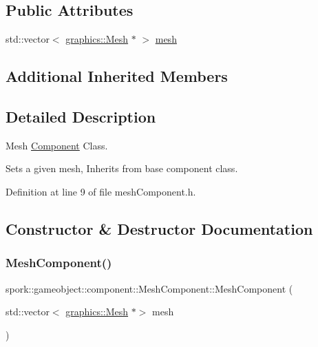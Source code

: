 \subsection*{Public Attributes}
\begin{DoxyCompactItemize}
\item 
std\+::vector$<$ \hyperlink{classspork_1_1graphics_1_1_mesh}{graphics\+::\+Mesh} $\ast$ $>$ \hyperlink{classspork_1_1gameobject_1_1component_1_1_mesh_component_a7d59263e36ff884bc0e8dc50bab78871}{mesh}
\end{DoxyCompactItemize}
\subsection*{Additional Inherited Members}


\subsection{Detailed Description}
Mesh \hyperlink{classspork_1_1gameobject_1_1component_1_1_component}{Component} Class. 

Sets a given mesh, Inherits from base component class. 

Definition at line 9 of file mesh\+Component.\+h.



\subsection{Constructor \& Destructor Documentation}
\mbox{\label{classspork_1_1gameobject_1_1component_1_1_mesh_component_ad4f541e517f9c2a7a252f7b5d6d42766}} 
\subsubsection{\texorpdfstring{Mesh\+Component()}{MeshComponent()}}
{\footnotesize\ttfamily spork\+::gameobject\+::component\+::\+Mesh\+Component\+::\+Mesh\+Component (\begin{DoxyParamCaption}\item[{std\+::vector$<$ \hyperlink{classspork_1_1graphics_1_1_mesh}{graphics\+::\+Mesh} $\ast$$>$}]{mesh }\end{DoxyParamCaption})}



